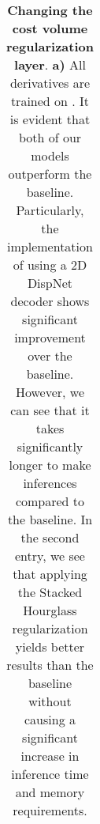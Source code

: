 \begin{table}[ht!]
\begin{adjustbox}{width=1\textwidth}
\begin{tabular}{|l
|c c
|c c
|c c
|c c
|c c
||c |c |c |c |c
|}
\hline
\end{tabular}
\end{adjustbox}
\caption[Changing the cost volume regularization layer]{\textbf{Changing the cost volume regularization layer}.
\textbf{a)} All {\mvsn} derivatives are trained on {\bms}. It is evident that both of our models outperform the baseline. Particularly, the implementation of {\mvsn} using a 2D DispNet decoder shows significant improvement over the baseline. However, we can see that it takes significantly longer to make inferences compared to the baseline. In the second entry, we see that applying the Stacked Hourglass regularization yields better results than the baseline without causing a significant increase in inference time and memory requirements.
\label{tab:cvr}
}
\end{table}

